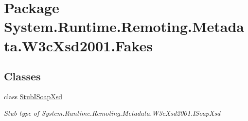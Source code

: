\hypertarget{namespace_system_1_1_runtime_1_1_remoting_1_1_metadata_1_1_w3c_xsd2001_1_1_fakes}{\section{Package System.\-Runtime.\-Remoting.\-Metadata.\-W3c\-Xsd2001.\-Fakes}
\label{namespace_system_1_1_runtime_1_1_remoting_1_1_metadata_1_1_w3c_xsd2001_1_1_fakes}
}
\subsection*{Classes}
\begin{DoxyCompactItemize}
\item 
class \hyperlink{class_system_1_1_runtime_1_1_remoting_1_1_metadata_1_1_w3c_xsd2001_1_1_fakes_1_1_stub_i_soap_xsd}{Stub\-I\-Soap\-Xsd}
\begin{DoxyCompactList}\small\item\em Stub type of System.\-Runtime.\-Remoting.\-Metadata.\-W3c\-Xsd2001.\-I\-Soap\-Xsd\end{DoxyCompactList}\end{DoxyCompactItemize}

